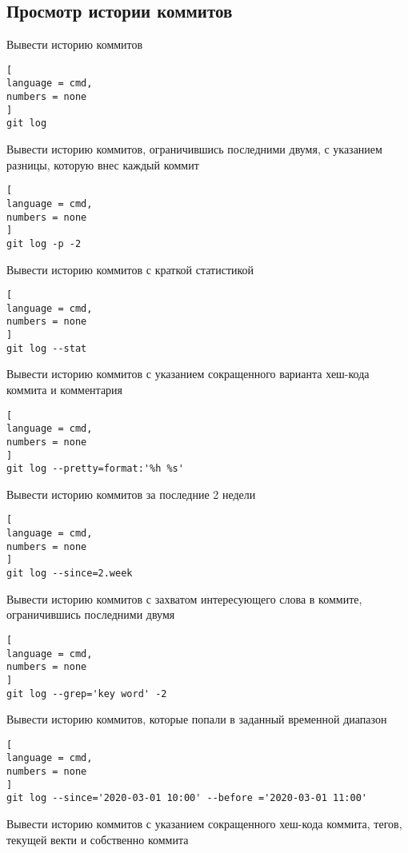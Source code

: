 \documentclass[%
	11pt,
	a4paper,
	utf8,
		]{article}
\begin{document}
\subsection{Просмотр истории коммитов}

Вывести историю коммитов

\begin{lstlisting}[
language = cmd,
numbers = none
]
git log
\end{lstlisting}


Вывести историю коммитов, ограничившись последними двумя, с указанием разницы, которую внес каждый коммит

\begin{lstlisting}[
language = cmd,
numbers = none
]
git log -p -2
\end{lstlisting}

Вывести историю коммитов с краткой статистикой

\begin{lstlisting}[
language = cmd,
numbers = none
]
git log --stat
\end{lstlisting}

Вывести историю коммитов с указанием сокращенного варианта хеш-кода коммита и комментария

\begin{lstlisting}[
language = cmd,
numbers = none
]
git log --pretty=format:'%h %s'
\end{lstlisting}


Вывести историю коммитов за последние 2 недели

\begin{lstlisting}[
language = cmd,
numbers = none
]
git log --since=2.week
\end{lstlisting}


Вывести историю коммитов с захватом интересующего слова в коммите, ограничившись последними двумя

\begin{lstlisting}[
language = cmd,
numbers = none
]
git log --grep='key word' -2
\end{lstlisting}


Вывести историю коммитов, которые попали в заданный временной диапазон

\begin{lstlisting}[
language = cmd,
numbers = none
]
git log --since='2020-03-01 10:00' --before ='2020-03-01 11:00'
\end{lstlisting}


Вывести историю коммитов с указанием сокращенного хеш-кода коммита, тегов, текущей векти и собственно коммита
\end{document}
